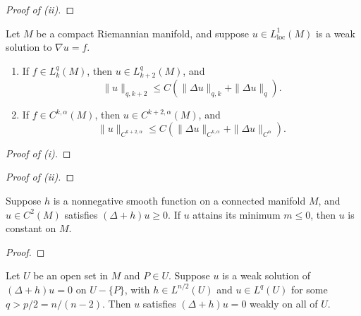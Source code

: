 \begin{proof}[Proof of (ii)]
\end{proof}

\begin{theorem}
  \label{thm:global_elliptic_regularity}

  Let $M$ be a compact Riemannian manifold, and suppose $u \in L^1_{\text{loc}}(M)$ is a weak solution to $\nabla u = f$.

  \begin{enumerate}
    \item If $f \in L^q_k(M)$, then $u \in L^q_{k+2}(M)$, and
      \[%
        \|u\|_{q,k+2} \le C\left(\|\Delta u\|_{q,k} + \|\Delta u\|_q\right)
      .\]%
    \item If $f \in C^{k,\alpha}(M)$, then $u \in C^{k+2,\alpha}(M)$, and
      \[%
        \|u\|_{C^{k+2,\alpha}} \le C\left(\|\Delta u\|_{C^{k,\alpha}} + \|\Delta u\|_{C^\alpha}\right)
      .\]%
  \end{enumerate}
\end{theorem}

\begin{computational-work}\leavevmode
  \label{cw:global_elliptic_regularity}
\end{computational-work}

\begin{proof}[Proof of (i)]
\end{proof}

\begin{proof}[Proof of (ii)]
\end{proof}

\begin{theorem}
  \label{thm:strong_maximum_principle}

  Suppose $h$ is a nonnegative smooth function on a connected manifold $M$, and $u \in C^2(M)$ satisfies $(\Delta + h)u \ge 0$. If $u$ attains its minimum $m \le 0$, then $u$ is constant on $M$.
\end{theorem}

\begin{computational-work}\leavevmode
  \label{cw:strong_maximum_principle}
\end{computational-work}

\begin{proof}
\end{proof}

\begin{proposition}
  \label{prop:weak_removable_singularities}

  Let $U$ be an open set in $M$ and $P \in U$. Suppose $u$ is a weak solution of $(\Delta + h)u = 0$ on $U - \{P\}$, with $h \in L^{n/2}(U)$ and $u \in L^q(U)$ for some $q > p/2 = n/(n - 2)$. Then $u$ satisfies $(\Delta + h)u = 0$ weakly on all of $U$.
\end{proposition}


